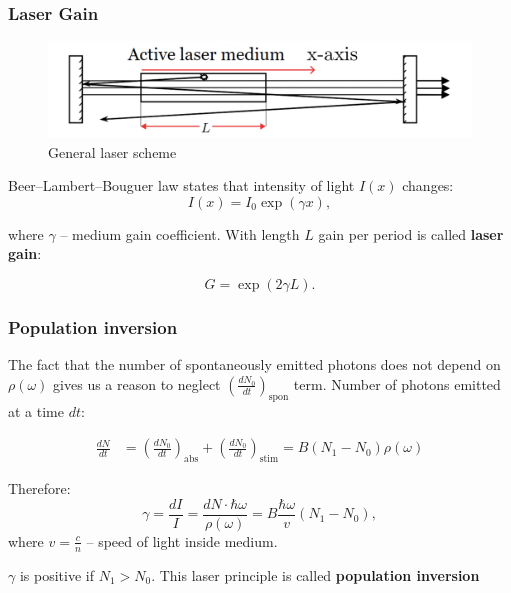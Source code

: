 \documentclass{beamer}
\begin{document}
	\begin{frame}
	\frametitle{Laser Gain}
	
	\begin{figure}
		\centering
		\includegraphics[width=1\linewidth]{res/general_laser_scheme.pdf}
		\caption{General laser scheme}
		\label{fig:general_laser_scheme}
	\end{figure}
	Beer–Lambert–Bouguer law states that intensity of light $I(x)$ changes:
	$$I(x) = I_0 \exp({\gamma x}),$$
	
	where $\gamma$ -- medium gain coefficient. With length $L$ gain per period is called \textbf{laser gain}:
	
	$$G = \exp{(2\gamma L)}.$$
	\end{frame}
	
	\begin{frame}
		\frametitle{Population inversion}
		The fact that the number of spontaneously emitted photons does not depend on  $\rho(\omega)$ gives us a reason to neglect $\left(\frac{dN_0}{dt}\right)_{\text{spon}}$ term. Number of photons emitted at a time $dt$:
		
		\begin{equation} \label{eq1}
			\begin{split}
				\frac{dN}{dt} & = \left(\frac{dN_0}{dt}\right)_{\text{abs}} + \left(\frac{dN_0}{dt}\right)_{\text{stim}} =  B (N_1 - N_0) \rho(\omega)
			\end{split}
		\end{equation}

		Therefore:
		\begin{equation}
			\gamma = \frac{dI}{I} = \frac{dN \cdot \hbar\omega}{\rho(\omega)} = B\frac{\hbar\omega }{v} (N_1 - N_0), 
		\end{equation}
		where $v = \frac{c}{n}$ -- speed of light inside medium.
		
		\vspace*{20px}
		\centering
		$\gamma$ is positive if $N_1 > N_0$. This laser principle is called \textbf{population inversion}
	\end{frame}
\end{document}
